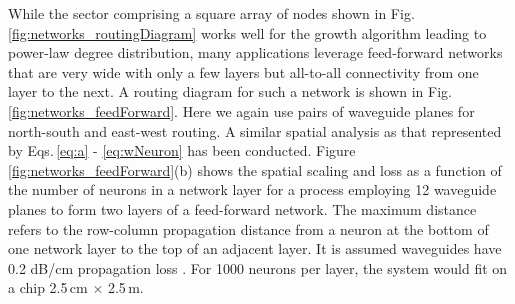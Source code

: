 \documentclass[aip,amsmath,amssymb,reprint,nofootinbib]{revtex4-1}
\begin{document}
While the sector comprising a square array of nodes shown in Fig.\,\ref{fig:networks_routingDiagram} works well for the growth algorithm leading to power-law degree distribution, many applications leverage feed-forward networks that are very wide with only a few layers but all-to-all connectivity from one layer to the next. A routing diagram for such a network is shown in Fig.\,\ref{fig:networks_feedForward}. Here we again use pairs of waveguide planes for north-south and east-west routing. A similar spatial analysis as that represented by Eqs.\,\ref{eq:a} - \ref{eq:wNeuron} has been conducted. Figure \ref{fig:networks_feedForward}(b) shows the spatial scaling and loss as a function of the number of neurons in a network layer for a process employing 12 waveguide planes to form two layers of a feed-forward network. The maximum distance refers to the row-column propagation distance from a neuron at the bottom of one network layer to the top of an adjacent layer. It is assumed waveguides have 0.2 dB/cm propagation loss \cite{ch2018}. For 1000 neurons per layer, the system would fit on a chip 2.5\,cm $\times$ 2.5\,m.
\end{document}
